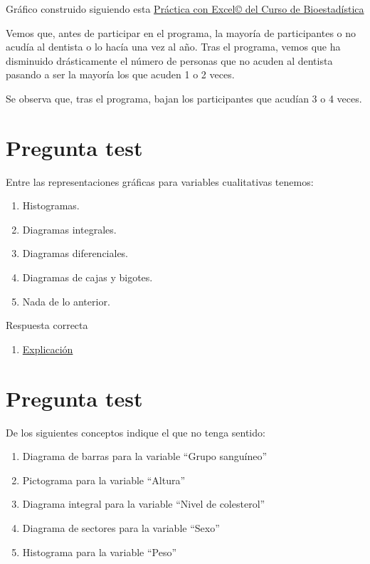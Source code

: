 \documentclass[
]{book}
\providecommand{\tightlist}{%
  \setlength{\itemsep}{0pt}\setlength{\parskip}{0pt}}
\begin{document}
Gráfico construido siguiendo esta \href{https://1fjmanzano.github.io/bioestadistica/diagramas-de-barras-y-sectores.html}{Práctica con Excel© del Curso de Bioestadística}

Vemos que, antes de participar en el programa, la mayoría de participantes o no acudía al dentista o lo hacía una vez al año. Tras el programa, vemos que ha disminuido drásticamente el número de personas que no acuden al dentista pasando a ser la mayoría los que acuden 1 o 2 veces.

Se observa que, tras el programa, bajan los participantes que acudían 3 o 4 veces.

\hypertarget{pregunta-test-53}{%
\section{Pregunta test}\label{pregunta-test-53}}

Entre las representaciones gráficas para variables cualitativas tenemos:

\begin{enumerate}
\def\labelenumi{\alph{enumi})}
\tightlist
\item
  Histogramas.
\item
  Diagramas integrales.
\item
  Diagramas diferenciales.
\item
  Diagramas de cajas y bigotes.
\item
  Nada de lo anterior.
\end{enumerate}

Respuesta correcta

\begin{enumerate}
\def\labelenumi{\alph{enumi})}
\setcounter{enumi}{3}
\tightlist
\item
  \href{https://1fjmanzano.github.io/bioestadistica/diagramas-de-barras-y-sectores.html}{Explicación}
\end{enumerate}

\hypertarget{pregunta-test-54}{%
\section{Pregunta test}\label{pregunta-test-54}}

De los siguientes conceptos indique el que no tenga sentido:

\begin{enumerate}
\def\labelenumi{\alph{enumi})}
\tightlist
\item
  Diagrama de barras para la variable ``Grupo sanguíneo''
\item
  Pictograma para la variable ``Altura''
\item
  Diagrama integral para la variable ``Nivel de colesterol''
\item
  Diagrama de sectores para la variable ``Sexo''
\item
  Histograma para la variable ``Peso''
\end{enumerate}
\end{document}
